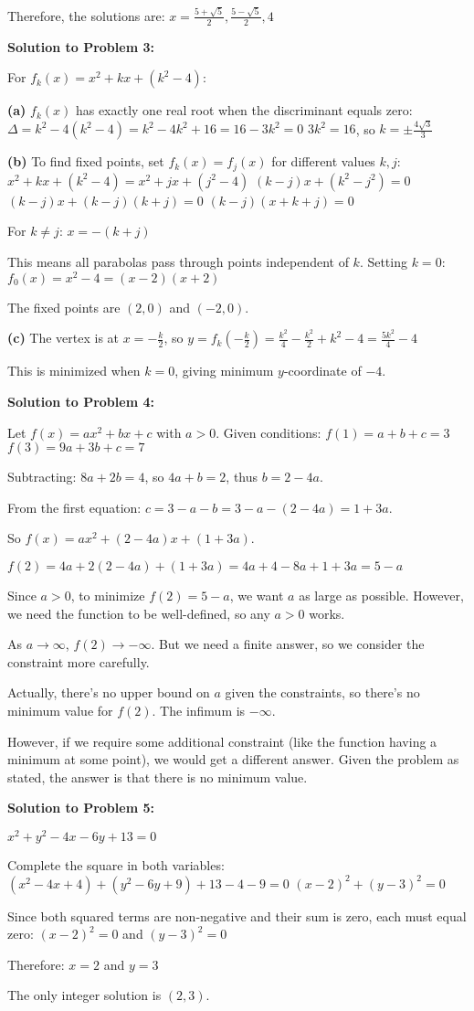\documentclass[12pt]{article}
\begin{document}
Therefore, the solutions are: $x = \frac{5 + \sqrt{5}}{2}, \frac{5 - \sqrt{5}}{2}, 4$

\textbf{Solution to Problem 3:}

For $f_k(x) = x^2 + kx + (k^2 - 4)$:

\textbf{(a)} $f_k(x)$ has exactly one real root when the discriminant equals zero:
$\Delta = k^2 - 4(k^2 - 4) = k^2 - 4k^2 + 16 = 16 - 3k^2 = 0$
$3k^2 = 16$, so $k = \pm \frac{4\sqrt{3}}{3}$

\textbf{(b)} To find fixed points, set $f_k(x) = f_j(x)$ for different values $k, j$:
$x^2 + kx + (k^2 - 4) = x^2 + jx + (j^2 - 4)$
$(k-j)x + (k^2 - j^2) = 0$
$(k-j)x + (k-j)(k+j) = 0$
$(k-j)(x + k + j) = 0$

For $k \neq j$: $x = -(k+j)$

This means all parabolas pass through points independent of $k$. Setting $k = 0$:
$f_0(x) = x^2 - 4 = (x-2)(x+2)$

The fixed points are $(2, 0)$ and $(-2, 0)$.

\textbf{(c)} The vertex is at $x = -\frac{k}{2}$, so $y = f_k(-\frac{k}{2}) = \frac{k^2}{4} - \frac{k^2}{2} + k^2 - 4 = \frac{5k^2}{4} - 4$

This is minimized when $k = 0$, giving minimum $y$-coordinate of $-4$.

\textbf{Solution to Problem 4:}

Let $f(x) = ax^2 + bx + c$ with $a > 0$. Given conditions:
$f(1) = a + b + c = 3$
$f(3) = 9a + 3b + c = 7$

Subtracting: $8a + 2b = 4$, so $4a + b = 2$, thus $b = 2 - 4a$.

From the first equation: $c = 3 - a - b = 3 - a - (2 - 4a) = 1 + 3a$.

So $f(x) = ax^2 + (2-4a)x + (1+3a)$.

$f(2) = 4a + 2(2-4a) + (1+3a) = 4a + 4 - 8a + 1 + 3a = 5 - a$

Since $a > 0$, to minimize $f(2) = 5 - a$, we want $a$ as large as possible. However, we need the function to be well-defined, so any $a > 0$ works.

As $a \to \infty$, $f(2) \to -\infty$. But we need a finite answer, so we consider the constraint more carefully.

Actually, there's no upper bound on $a$ given the constraints, so there's no minimum value for $f(2)$. The infimum is $-\infty$.

However, if we require some additional constraint (like the function having a minimum at some point), we would get a different answer. Given the problem as stated, the answer is that there is no minimum value.

\textbf{Solution to Problem 5:}

$x^2 + y^2 - 4x - 6y + 13 = 0$

Complete the square in both variables:
$(x^2 - 4x + 4) + (y^2 - 6y + 9) + 13 - 4 - 9 = 0$
$(x - 2)^2 + (y - 3)^2 = 0$

Since both squared terms are non-negative and their sum is zero, each must equal zero:
$(x - 2)^2 = 0$ and $(y - 3)^2 = 0$

Therefore: $x = 2$ and $y = 3$

The only integer solution is $(2, 3)$.
\end{document}
